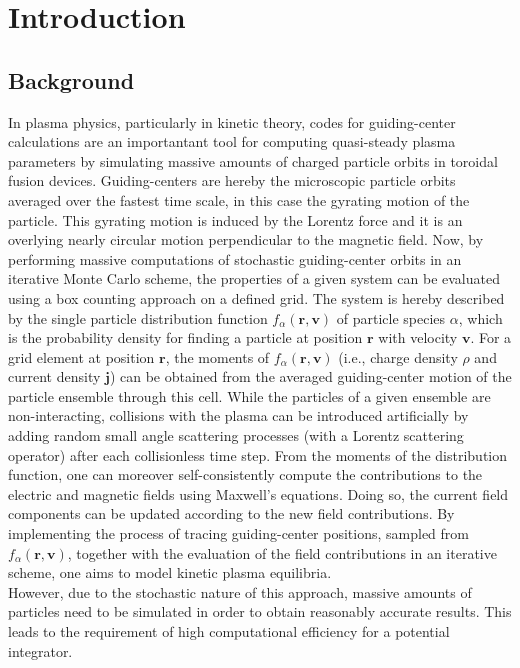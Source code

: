 \documentclass[main.tex]{subfiles}
\begin{document}
\chapter{Introduction}
\setcounter{page}{1}
\label{chp:introduction}
\section{Background}
In plasma physics, particularly in kinetic theory, codes for guiding-center calculations are an importantant tool for computing quasi-steady plasma parameters by simulating massive amounts of charged particle orbits in toroidal fusion devices. Guiding-centers are hereby the microscopic particle orbits averaged over the fastest time scale, in this case the gyrating motion of the particle. This gyrating motion is induced by the Lorentz force and it is an overlying nearly circular motion perpendicular to the magnetic field. Now, by performing massive computations of stochastic guiding-center orbits in an iterative Monte Carlo scheme, the properties of a given system can be evaluated using a box counting approach on a defined grid. The system is hereby described by the single particle distribution function $f_\alpha(\textbf{r},\textbf{v})$ of particle species $\alpha$, which is the probability density for finding a particle at position $\textbf{r}$ with velocity $\textbf{v}$. For a grid element at position $\textbf{r}$, the moments of $f_\alpha(\textbf{r},\textbf{v})$ (i.e., charge density $\rho$ and current density $\textbf{j}$) can be obtained from the averaged guiding-center motion of the particle ensemble through this cell. While the particles of a given ensemble are non-interacting, collisions with the plasma can be introduced artificially by adding random small angle scattering processes (with a Lorentz scattering operator) after each collisionless time step. From the moments of the distribution function, one can moreover self-consistently compute the contributions to the electric and magnetic fields using Maxwell's equations. Doing so, the current field components can be updated according to the new field contributions. By implementing the process of tracing guiding-center positions, sampled from $f_\alpha(\textbf{r},\textbf{v})$, together with the evaluation of the field contributions in an iterative scheme, one aims to model kinetic plasma equilibria. \\
However, due to the stochastic nature of this approach, massive amounts of particles need to be simulated in order to obtain reasonably accurate results. This leads to the requirement of high computational efficiency for a potential integrator.
\end{document}
